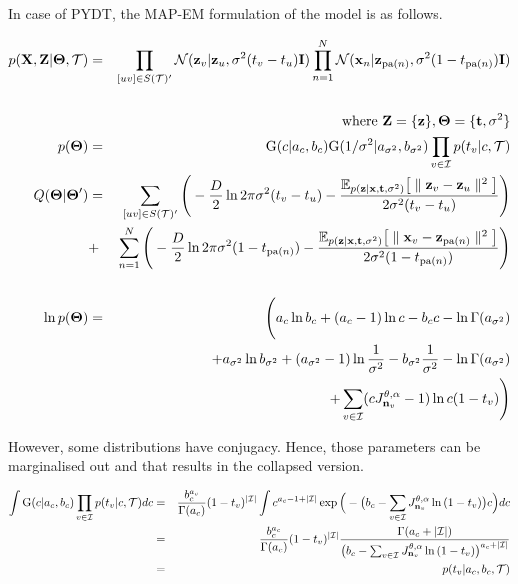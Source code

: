 \documentclass{article}
\begin{document}
	
	In case of PYDT, the MAP-EM formulation of the model is as follows.
	
	\begin{eqnarray}
		p(\bold{X}, \bold{Z} | \boldsymbol{\Theta}, \mathcal{T}) &=& 
		\prod_{[uv] \in S(\mathcal{T})'} \mathcal{N}(\bold{z}_v|\bold{z}_u, \sigma^2(t_v - t_u)\bold{I}) \prod^N_{n=1} \mathcal{N}(\bold{x}_n|\bold{z}_{\textrm{pa}(n)}, \sigma^2(1 - t_{\textrm{pa}(n)})\bold{I}) \nonumber \\
		& & \\
		& & \textrm{where } \bold{Z} = \{\bold{z} \}, \boldsymbol{\Theta} = \{\bold{t}, \sigma^2\} \nonumber \\
		p(\boldsymbol{\Theta}) &=& \textrm{G}(c | a_c, b_c) \textrm{G}(1/\sigma^2 | a_{\sigma^2}, b_{\sigma^2}) \prod_{v \in \mathcal{I}} p(t_v | c, \mathcal{T}) \\
		Q(\boldsymbol{\Theta} | \boldsymbol{\Theta}') &=& \sum_{[uv] \in S(\mathcal{T})'} \Bigg(-\frac{D}{2}\ln2\pi\sigma^2(t_v - t_u) - \frac{ \mathbb{E}_{p(\bold{z}|\bold{x}, \bold{t}, \sigma^2)} \big[\parallel \bold{z}_v - \bold{z}_u \parallel^2 \big]}{2\sigma^2(t_v - t_u)} \Bigg) \nonumber \\
	 	&+& \sum^N_{n=1} \Bigg(-\frac{D}{2}\ln2\pi\sigma^2(1 - t_{\textrm{pa}(n)}) - \frac{\mathbb{E}_{p(\bold{z}|\bold{x}, \bold{t}, \sigma^2)} \big[ \parallel \bold{x}_v - \bold{z}_{\textrm{pa}(n)} \parallel^2 \big]}{2\sigma^2(1 - t_{\textrm{pa}(n)})} \Bigg) \nonumber \\
	 	& & \\
	 	\ln p(\boldsymbol{\Theta}) &=& \Bigg(a_c \ln{b_c} + (a_c - 1)\ln{c} - b_cc - \ln{\Gamma(a_{\sigma^2})} \nonumber \\
	 	& & + a_{\sigma^2} \ln{b_{\sigma^2}} + (a_{\sigma^2} - 1)\ln{\frac{1}{\sigma^2}} - b_{\sigma^2}\frac{1}{\sigma^2} - \ln{\Gamma(a_{\sigma^2})} \nonumber \\
	 	& & + \sum_{v \in \mathcal{I}} (cJ^{\theta, \alpha}_{\bold{n}_v} - 1) \ln{c(1 - t_v)} \Bigg)
	\end{eqnarray}
	
	However, some distributions have conjugacy. Hence, those parameters can be marginalised out and that results in the collapsed version.
	
	\begin{eqnarray}
		\int \textrm{G}(c | a_c, b_c) \prod_{v \in \mathcal{I}} p(t_v | c, \mathcal{T}) dc &=& \frac{b^{a_c}_c}{\Gamma(a_c)}(1 - t_v)^{|\mathcal{I}|} \int c^{a_c - 1 + |\mathcal{I}|} \exp \Big( - \big( b_c - \sum_{v \in \mathcal{I}} J^{\theta, \alpha}_{\bold{n}_v} \ln{(1 - t_v)} \big) c \Big) dc \nonumber \\
		&=& \frac{b^{a_c}_c}{\Gamma(a_c)}(1 - t_v)^{|\mathcal{I}|} \frac{\Gamma(a_c + |\mathcal{I}|)}{\big( b_c - \sum_{v \in \mathcal{I}} J^{\theta, \alpha}_{\bold{n}_v} \ln{(1 - t_v)} \big)^{a_c + |\mathcal{I}|}} \nonumber \\
		&=& p(t_v | a_c, b_c, \mathcal{T})
	\end{eqnarray}
\end{document}
